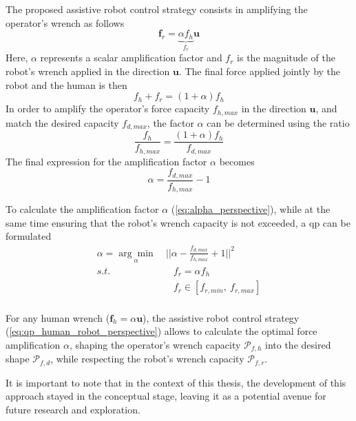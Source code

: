 The proposed assistive robot control strategy consists in amplifying the operator's wrench as follows
\begin{equation}
\bm{f}_r = \underbrace{\alpha f_h}_{f_r}\bm{u}
\label{eq:force_amp_perspective}
\end{equation}
Here, $\alpha$ represents a scalar amplification factor and $f_r$ is the magnitude of the robot's wrench applied in the direction $\bm{u}$. 
The final force applied jointly by the robot and the human is then
\begin{equation}
f_h + f_r = (1+\alpha)f_h
\end{equation}
In order to amplify the operator's force capacity $f_{h,max}$ in the direction $\bm{u}$, and match the desired capacity $f_{d,max}$, the factor $\alpha$ can be determined using the ratio
\begin{equation}
\frac{f_{h}}{f_{h,max}} = \frac{(1 + \alpha) f_h}{f_{d,max}}
\end{equation}
The final expression for the amplification factor $\alpha$ becomes
\begin{equation}
\alpha = \frac{f_{d,max}}{f_{h,max}}-1
\label{eq:alpha_perspective}
\end{equation}

To calculate the amplification factor $\alpha$ (\ref{eq:alpha_perspective}), while at the same time ensuring that the robot's wrench capacity is not exceeded, a \gls{qp} can be formulated
\begin{equation}
    \begin{split}
        \alpha =\underset{\alpha}{\arg\min} &~\Big|\Big|\alpha- \frac{f_{d,max}}{f_{h,max}}+1\Big|\Big|^2\\
        s.t.& \quad f_r  = \alpha f_h\\
        & \quad f_r \in[f_{r,min}, ~f_{r,max}]\\
    \end{split}
    \label{eq:qp_human_robot_perspective}
\end{equation}

For any human wrench ($\bm{f}_h=\alpha\bm{u}$), the assistive robot control strategy (\ref{eq:qp_human_robot_perspective}) allows to calculate the optimal force amplification $\alpha$, shaping the operator's wrench capacity $\mathcal{P}_{f,h}$ into the desired shape $\mathcal{P}_{f,d}$, while respecting the robot's wrench capacity $\mathcal{P}_{f,r}$. 


It is important to note that in the context of this thesis, the development of this approach stayed in the conceptual stage, leaving it as a potential avenue for future research and exploration.

